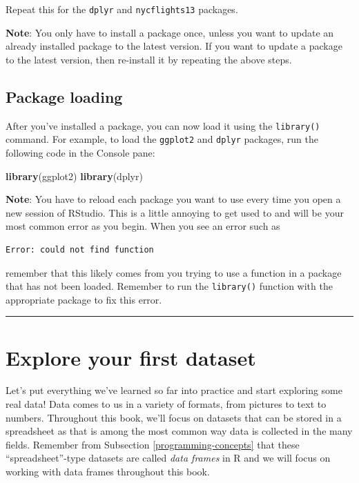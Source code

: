\documentclass[12pt,]{krantz}
\makeatletter
\newenvironment{Shaded}{\begin{snugshade}}{\end{snugshade}}
\newcommand{\KeywordTok}[1]{\textcolor[rgb]{0.27,0.27,0.27}{\textbf{#1}}}
\newcommand{\NormalTok}[1]{#1}
\newenvironment{kframe}{%
\medskip{}
\setlength{\fboxsep}{.8em}
 \def\at@end@of@kframe{}%
 \ifinner\ifhmode%
  \def\at@end@of@kframe{\end{minipage}}%
  \begin{minipage}{\columnwidth}%
 \fi\fi%
 \def\FrameCommand##1{\hskip\@totalleftmargin \hskip-\fboxsep
 \colorbox{shadecolor}{##1}\hskip-\fboxsep
     \hskip-\linewidth \hskip-\@totalleftmargin \hskip\columnwidth}%
 \MakeFramed {\advance\hsize-\width
   \@totalleftmargin\z@ \linewidth\hsize
   \@setminipage}}%
 {\par\unskip\endMakeFramed%
 \at@end@of@kframe}
\renewenvironment{Shaded}{\begin{kframe}}{\end{kframe}}
\theoremstyle{definition}
\theoremstyle{definition}
\theoremstyle{definition}
\theoremstyle{remark}
\makeatother
\begin{document}
Repeat this for the \texttt{dplyr} and \texttt{nycflights13} packages.

\textbf{Note}: You only have to install a package once, unless you want
to update an already installed package to the latest version. If you
want to update a package to the latest version, then re-install it by
repeating the above steps.

\subsection{Package loading}\label{package-loading}

After you've installed a package, you can now load it using the
\texttt{library()} command. For example, to load the \texttt{ggplot2}
and \texttt{dplyr} packages, run the following code in the Console pane:

\begin{Shaded}
\begin{Highlighting}[]
\KeywordTok{library}\NormalTok{(ggplot2)}
\KeywordTok{library}\NormalTok{(dplyr)}
\end{Highlighting}
\end{Shaded}

\textbf{Note}: You have to reload each package you want to use every
time you open a new session of RStudio. This is a little annoying to get
used to and will be your most common error as you begin. When you see an
error such as

\begin{verbatim}
Error: could not find function
\end{verbatim}

remember that this likely comes from you trying to use a function in a
package that has not been loaded. Remember to run the \texttt{library()}
function with the appropriate package to fix this error.

\begin{center}\rule{0.5\linewidth}{\linethickness}\end{center}

\section{Explore your first dataset}\label{nycflights13}

Let's put everything we've learned so far into practice and start
exploring some real data! Data comes to us in a variety of formats, from
pictures to text to numbers. Throughout this book, we'll focus on
datasets that can be stored in a spreadsheet as that is among the most
common way data is collected in the many fields. Remember from
Subsection \ref{programming-concepts} that these ``spreadsheet''-type
datasets are called \emph{data frames} in R and we will focus on working
with data frames throughout this book.
\end{document}
